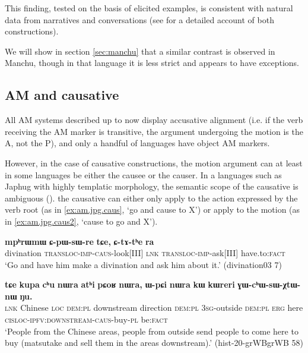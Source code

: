\documentclass{article}
\newcommand{\ipa}[1]{\textbf{{\phon\mbox{#1}}}} %
\begin{document}
This finding, tested on the basis of elicited examples, is consistent with natural data from narratives and conversations (see \citealt{jacques13harmonization} for a detailed account of both constructions).
  
We will show in section \ref{sec:manchu} that a similar contrast is observed in Manchu, though in that language it is less strict and appears to have exceptions.

  
\subsection{AM and causative} \label{sec:japhug.am.caus}
All AM systems described up to now display accusative alignment (i.e. if the verb receiving the AM marker is transitive, the argument undergoing the motion is the A, not the P), and only a handful of languages have object AM markers. 

However, in the case of causative constructions, the motion argument can at least in some languages be either the causee or the causer. In a languages such as Japhug with highly templatic morphology, the semantic scope of the causative is ambiguous (\citealt[182]{jacques15causative}). the causative can either only apply to the action expressed by the verb root (as in  \ref{ex:am.jpg.caus}, `go and cause to X')  or apply to the motion (as in \ref{ex:am.jpg.caus2}, `cause to go and X').


  \begin{exe}
\ex \label{ex:am.jpg.caus}
\gll
\ipa{mpʰrɯmɯ} 	\ipa{ɕ-pɯ-sɯ-re} 	\ipa{tɕe,} 	\ipa{ɕ-tɤ-tʰe} 	\ipa{ra} \\
divination \textsc{transloc-imp-caus}-look[III] \textsc{lnk} \textsc{transloc-imp}-ask[III] have.to:\textsc{fact} \\
\glt  `Go and have him make a divination and ask him about it.' (divination03 7)
  \end{exe} 

  \begin{exe}
\ex \label{ex:am.jpg.caus2}
\gll
\ipa{tɕe} 	\ipa{kupa} 	\ipa{cʰu} 	\ipa{nɯra} 	\ipa{atʰi} 	\ipa{pɕoʁ} 	\ipa{nɯra,} 	\ipa{ɯ-pɕi} 	\ipa{nɯra} 	\ipa{kɯ} 	\ipa{kɯreri} 	\ipa{ɣɯ-cʰɯ-sɯ-χtɯ-nɯ} 	\ipa{ŋu.}  \\
\textsc{lnk} Chinese \textsc{loc} \textsc{dem:pl} downstream direction \textsc{dem:pl} \textsc{3sg}-outside  \textsc{dem:pl}  \textsc{erg} here \textsc{cisloc-ipfv:downstream-caus}-buy-\textsc{pl} be\textsc{:fact} \\
\glt `People from the Chinese areas, people from outside send people to come here to buy (matsutake and sell them in the areas downstream).' (hist-20-grWBgrWB 58)
  \end{exe} 
  
\end{document}
